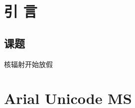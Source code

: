 \documentclass[UTF8, a4paper]{ctexart}
\newcommand{\upcite}[1]{\textsuperscript{\textsuperscript{
			\citeleft}\cite{#1}\textsuperscript{\citeright}}}					%
\begin{document}
	\fancyhead[C]{\leftmark}										%
	\setcounter{page}{1}
	\renewcommand{\sectionmark}[1]{\markboth{第\thesection 章\quad 	%
			\ #1}{}}
	\section{引\texorpdfstring{\quad}{} 言}							%
	\subsection{课题}
	核辐射开始放假\upcite{1,2,3}
	\newpage
	\section{Arial Unicode MS}
	
\end{document}
